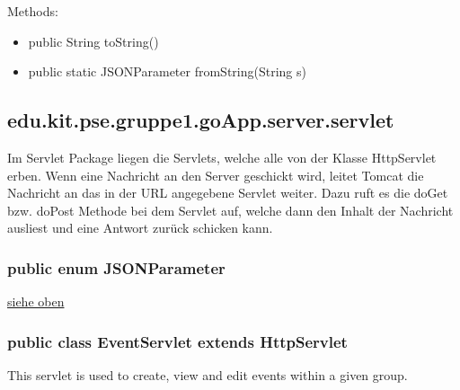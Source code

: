 Methods:
\begin{itemize}
	\item public String toString()
		
	\item public static JSONParameter fromString(String s)
\end{itemize}

\hypertarget{servlet}{}
\hypertarget{Servlets}{}
	\subsection{edu.kit.pse.gruppe1.goApp.server.servlet}
	Im Servlet Package liegen die Servlets, welche alle von der Klasse HttpServlet erben.
	Wenn eine Nachricht an den Server geschickt wird, leitet Tomcat die Nachricht an das in der URL angegebene Servlet weiter.
	Dazu ruft es die doGet bzw. doPost Methode bei dem Servlet auf, welche dann den Inhalt der Nachricht ausliest und eine Antwort zurück schicken kann.
	\subsubsection{public enum JSONParameter}
	\hyperlink{JSONParameter}{siehe oben}
\subsubsection{public class EventServlet extends HttpServlet}
This servlet is used to create, view and edit events within a given group.

